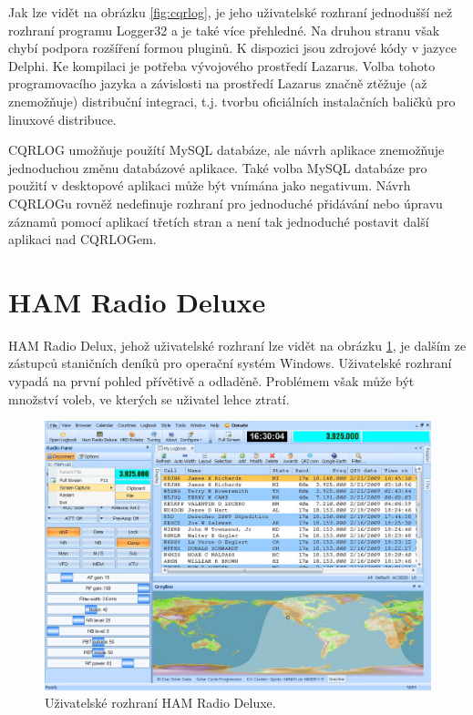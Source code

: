 Jak lze vidět na obrázku \ref{fig:cqrlog}, je jeho uživatelské rozhraní jednodušší než rozhraní programu Logger32 a je
také více přehledné. Na druhou stranu však chybí podpora rozšíření formou pluginů. K dispozici jsou zdrojové kódy v jazyce
Delphi. Ke kompilaci je potřeba vývojového prostředí Lazarus. %
Volba tohoto programovacího jazyka a závislosti na prostředí Lazarus
značně ztěžuje (až znemožňuje) distribuční integraci, t.j. tvorbu oficiálních instalačních baličků pro linuxové distribuce.

CQRLOG umožňuje použítí
MySQL databáze, ale návrh aplikace znemožňuje jednoduchou změnu databázové aplikace. Také volba MySQL databáze pro použití 
v desktopové aplikaci může být vnímána jako negativum. Návrh CQRLOGu rovněž nedefinuje rozhraní pro jednoduché přidávání nebo úpravu
záznamů pomocí aplikací třetích stran a není tak jednoduché postavit další aplikaci nad CQRLOGem.

\section{HAM Radio Deluxe}

HAM Radio Delux, jehož uživatelské rozhraní lze vidět na obrázku \ref{fig:ham_radio_deluxe}, je dalším ze zástupců
staničních deníků pro operační systém Windows. Uživatelské rozhraní vypadá na první pohled přívětivě a odladěně.
Problémem však může být množství voleb, ve kterých se uživatel lehce ztratí.

\begin{figure}[h]
\centering
\includegraphics[trim=0cm 0cm 0cm 0cm, scale=0.33]{fig/hrd}
\caption{Uživatelské rozhraní HAM Radio Deluxe.}
\label{fig:ham_radio_deluxe}
\end{figure}

